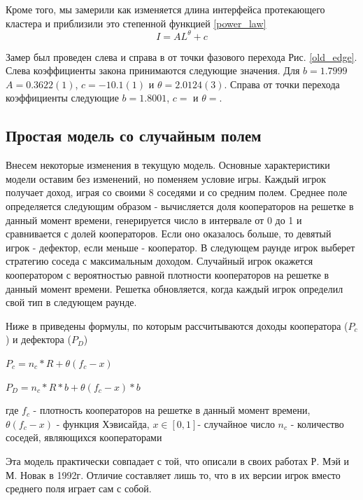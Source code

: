 \documentclass[a4paper]{article}
\begin{document}
	\par Кроме того, мы замерили как изменяется длина интерфейса протекающего кластера и приблизили это степенной функцией \ref{power_law}
	\begin{equation}
		I = AL^{\theta} +c
		\label{power_law}
	\end{equation}
	
	\par Замер был проведен слева и справа в от точки фазового перехода Рис. \ref{old_edge}. Слева коэффициенты закона принимаются следующие значения. Для $b=1.7999$ $A=0.3622(1)$,
	$c=-10.1(1)$ и $\theta=	2.0124(3)$. Справа от точки перехода коэффициенты следующие
	$b=1.8001$, $c= $ и $\theta= $.
	
	
	\subsection{Простая модель со случайным полем}
	
	\par Внесем некоторые изменения в текущую модель. Основные характеристики модели
	оставим без изменений, но поменяем условие игры. Каждый игрок получает доход, играя со своими 8 соседями и со средним полем. Среднее поле определяется следующим образом - вычисляется доля кооператоров на решетке в данный момент времени, генерируется число в интервале от 0 до 1 и сравнивается с долей кооператоров. Если оно оказалось больше, то девятый игрок - дефектор, если меньше - кооператор. В следующем раунде игрок выберет стратегию соседа с максимальным доходом. Случайный игрок окажется кооператором с вероятностью равной плотности кооператоров на решетке в данный момент времени. Решетка 
	обновляется, когда каждый игрок определил свой тип в следующем раунде.
	
	\par Ниже в приведены формулы, по которым рассчитываются доходы кооператора ($P_{c}$) и дефектора ($P_{D}$)
	
	$ P_{c}= n_{c}*R+ \theta(f_{c}-x) $
	
	$ P_{D}= n_{c}*R*b+ \theta(f_{c}-x)*b $
	
	где $ f_{c}$ - плотность кооператоров на решетке в данный момент
	времени, $\theta(f_{c}-x)$ - функция Хэвисайда, $x \in [0,1]$- случайное число
	$n_{c}$ - количество соседей, являющихся кооператорами
	 
	
	\par Эта модель практически совпадает с той, что описали в своих работах Р. Мэй и
	М. Новак в 1992г. Отличие составляет лишь то, что в их версии игрок вместо среднего поля играет сам с собой.
	
\end{document}
